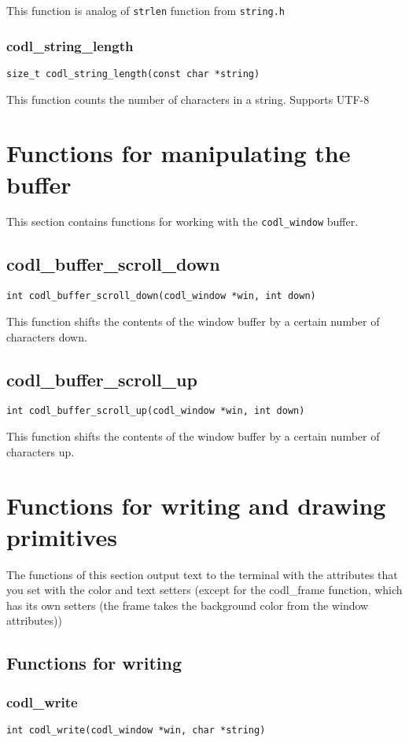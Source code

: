 \documentclass{article}
\newcommand{\fstep}{\vspace{3mm}\noindent}
\begin{document}
\fstep{} This function is analog of {\tt strlen} function from
{\tt string.h}

\subsubsection{codl\_string\_length}
{\tt size\_t codl\_string\_length(const char *string)}

\fstep{} This function counts the number of characters in a string.
Supports UTF-8

\section{Functions for manipulating the buffer}
This section contains functions for working with the {\tt codl\_window} buffer.

\subsection{codl\_buffer\_scroll\_down}
{\tt int codl\_buffer\_scroll\_down(codl\_window *win, int down)}
           
\fstep{} This function shifts the contents of the window buffer
by a certain number of characters down.

\subsection{codl\_buffer\_scroll\_up}
{\tt int codl\_buffer\_scroll\_up(codl\_window *win, int down)}
           
\fstep{} This function shifts the contents of the window buffer
by a certain number of characters up.

\section{Functions for writing and drawing primitives}
The functions of this section output text to the terminal with the attributes
that you set with the color and text setters (except for the codl\_frame
function, which has its own setters
(the frame takes the background color from the window attributes))


\subsection{Functions for writing}
\subsubsection{codl\_write}
{\tt int codl\_write(codl\_window *win, char *string)}
\end{document}
